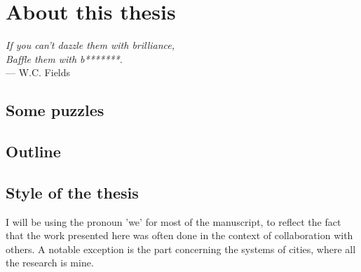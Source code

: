 

\chapter{About this thesis}
\label{chap:methodology}

\begin{flushright}{\slshape    
If you can't dazzle them with brilliance,\\
Baffle them with b*******.} \\ \medskip
--- W.C. Fields 
\end{flushright}


\bigskip


\section{Some puzzles}

\section{Outline}

\section{Style of the thesis}

I will be using the pronoun 'we' for most of the manuscript, to reflect the fact
that the work presented here was often done in the context of collaboration with others. A
notable exception is the part concerning the systems of cities, where all the
research is mine.
